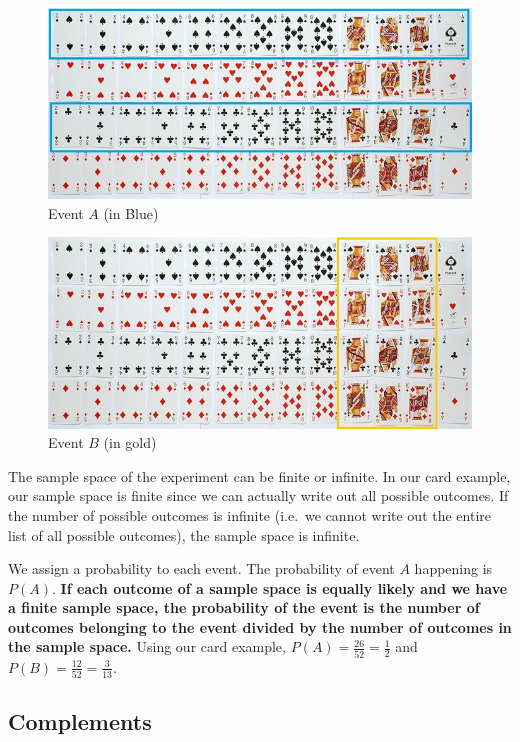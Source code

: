 \documentclass[
]{book}
\begin{document}
\begin{figure}
\centering
\includegraphics{images/02-cardsA.jpg}
\caption{\label{fig:cardsA}Event \(A\) (in Blue)}
\end{figure}

\begin{figure}
\centering
\includegraphics{images/02-cardsB.jpg}
\caption{\label{fig:cardsB}Event \(B\) (in gold)}
\end{figure}

The sample space of the experiment can be finite or infinite. In our card example, our sample space is finite since we can actually write out all possible outcomes. If the number of possible outcomes is infinite (i.e.~we cannot write out the entire list of all possible outcomes), the sample space is infinite.

We assign a probability to each event. The probability of event \(A\) happening is \(P(A)\). \textbf{If each outcome of a sample space is equally likely and we have a finite sample space, the probability of the event is the number of outcomes belonging to the event divided by the number of outcomes in the sample space.} Using our card example, \(P(A) = \frac{26}{52} = \frac{1}{2}\) and \(P(B) = \frac{12}{52} = \frac{3}{13}\).

\hypertarget{complements}{%
\subsection{Complements}\label{complements}}
\end{document}
